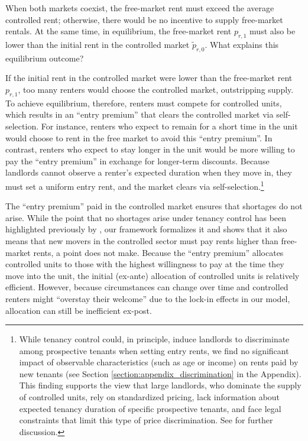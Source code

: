 \documentclass[parskip=full]{article}
\begin{document}
When both markets coexist, the free-market rent must exceed the average controlled rent; otherwise, there would be no incentive to supply free-market rentals. At the same time, in equilibrium, the free-market rent $p_{r,1}$ must also be lower than the initial rent in the controlled market $\tilde{p}_{r,0}$. What explains this equilibrium outcome?

If the initial rent in the controlled market were lower than the free-market rent $p_{r,1}$, too many renters would choose the controlled market, outstripping supply. To achieve equilibrium, therefore, renters must compete for controlled units, which results in an ``entry premium'' that clears the controlled market via self-selection. For instance, renters who expect to remain for a short time in the unit would choose to rent in the free market to avoid this ``entry premium''. In contrast, renters who expect to stay longer in the unit would be more willing to pay the ``entry premium'' in exchange for longer-term discounts. Because landlords cannot observe a renter's expected duration when they move in, they must set a uniform entry rent, and the market clears via self-selection.\footnote{While tenancy control could, in principle, induce landlords to discriminate among prospective tenants when setting entry rents, we find no significant impact of observable characteristics (such as age or income) on rents paid by new tenants (see Section \ref{section:appendix_discrimination} in the Appendix). This finding supports the view that large landlords, who dominate the supply of controlled units, rely on standardized pricing, lack information about expected tenancy duration of specific prospective tenants, and face legal constraints that limit this type of price discrimination. See \citet{be-2000} for further discussion.}

The ``entry premium'' paid in the controlled market ensures that shortages do not arise. While the point that no shortages arise under tenancy control has been highlighted previously by \citet{arnott-1995}, our framework formalizes it and shows that it also means that new movers in the controlled sector must pay rents higher than free-market rents, a point \citet{arnott-1995} does not make. Because the ``entry premium'' allocates controlled units to those with the highest willingness to pay at the time they move into the unit, the initial (ex-ante) allocation of controlled units is relatively efficient. However, because circumstances can change over time and controlled renters might ``overstay their welcome'' due to the lock-in effects in our model, allocation can still be inefficient ex-post. 
\end{document}
